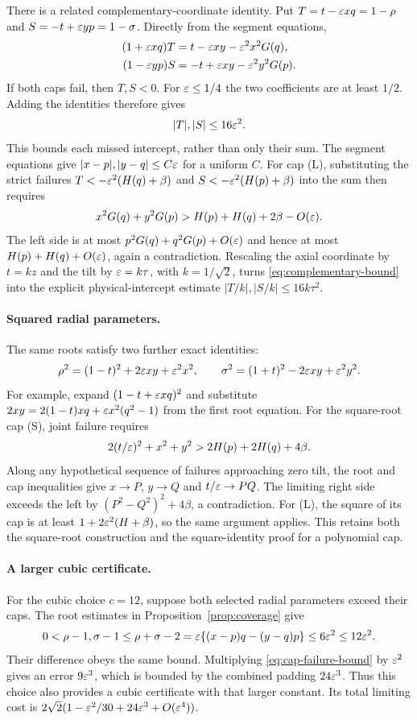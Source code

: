 There is a related complementary-coordinate identity. Put
$T=t-\varepsilon xq=1-\rho$ and $S=-t+\varepsilon yp=1-\sigma$. Directly from
the segment equations,
\begin{align}
 (1+\varepsilon xq)T&=t-\varepsilon xy-\varepsilon^2x^2G(q),\label{eq:complementary-one}\\
 (1-\varepsilon yp)S&=-t+\varepsilon xy-\varepsilon^2y^2G(p).\label{eq:complementary-two}
\end{align}
If both caps fail, then $T,S<0$. For $\varepsilon\le1/4$ the two
coefficients are at least $1/2$. Adding the identities therefore gives
\begin{equation}\label{eq:complementary-bound}
 |T|,|S|\le16\varepsilon^2.
\end{equation}
This bounds each missed intercept, rather than only their sum. The
segment equations give $|x-p|,|y-q|\le C\varepsilon$ for a uniform $C$.
For cap (L), substituting the strict failures $T<-\varepsilon^2(H(q)+\beta)$ and
$S<-\varepsilon^2(H(p)+\beta)$ into the sum then requires
\[
 x^2G(q)+y^2G(p)>H(p)+H(q)+2\beta-O(\varepsilon).
\]
The left side is at most $p^2G(q)+q^2G(p)+O(\varepsilon)$ and hence at
most $H(p)+H(q)+O(\varepsilon)$, again a contradiction. Rescaling the axial
coordinate by $t=kz$ and the tilt by $\varepsilon=k\tau$, with
$k=1/\sqrt2$, turns \eqref{eq:complementary-bound} into the explicit
physical-intercept estimate $|T/k|,|S/k|\le16k\tau^2$.

\paragraph{Squared radial parameters.}
The same roots satisfy two further exact identities:
\begin{equation}\label{eq:squared-radial-identities}
 \rho^2=(1-t)^2+2\varepsilon xy+\varepsilon^2x^2,
 \qquad
 \sigma^2=(1+t)^2-2\varepsilon xy+\varepsilon^2y^2.
\end{equation}
For example, expand $(1-t+\varepsilon xq)^2$ and substitute
$2xy=2(1-t)xq+\varepsilon x^2(q^2-1)$ from the first root equation.
For the square-root cap (S), joint failure requires
\[
 2(t/\varepsilon)^2+x^2+y^2>2H(p)+2H(q)+4\beta.
\]
Along any hypothetical sequence of failures approaching zero tilt,
the root and cap inequalities give $x\to P$, $y\to Q$ and
$t/\varepsilon\to PQ$. The limiting right side exceeds the left by
$(P^2-Q^2)^2+4\beta$, a contradiction. For (L), the square of its
cap is at least $1+2\varepsilon^2(H+\beta)$, so the same argument applies.
This retains both the square-root construction and the square-identity
proof for a polynomial cap.


\paragraph{A larger cubic certificate.}
For the cubic choice $c=12$, suppose both selected radial parameters
exceed their caps. The root estimates in Proposition~\ref{prop:coverage}
give
\[
 0<\rho-1,\sigma-1\le\rho+\sigma-2
 =\varepsilon\{(x-p)q-(y-q)p\}\le6\varepsilon^2\le12\varepsilon^2.
\]
Their difference obeys the same bound. Multiplying \eqref{eq:cap-failure-bound} by $\varepsilon^2$ gives an
error $9\varepsilon^3$, which is bounded by the combined padding
$24\varepsilon^3$. Thus this choice also provides a cubic certificate
with that larger constant. Its total limiting cost is
$2\sqrt2(1-\varepsilon^2/30+24\varepsilon^3+O(\varepsilon^4))$.

